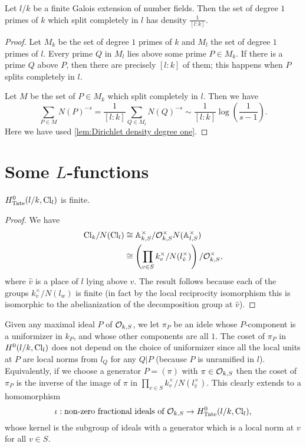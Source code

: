 \begin{lemma} \label{lem:Dirichlet density split}
	Let $l/k$ be a finite Galois extension of number fields.
	Then the set of degree $1$ primes of $k$ which split completely in $l$
	has density $\frac{1}{[l:k]}$.
\end{lemma}

\begin{proof}
	Let $M_k$ be the set of degree $1$ primes of $k$ and $M_l$ the set of degree $1$ primes of $l$.
	Every prime $Q$ in $M_l$ lies above some prime $P \in M_k$.
	If there is a prime $Q$ above $P$, then there are precisely $[l:k]$ of them; this happens when $P$
	splits completely in $l$.

	Let $M$ be the set of $P \in M_k$ which split completely in $l$.
	Then we have
	\[
		\sum_{P \in M} N(P)^{-s}
		=
		\frac{1}{[l:k]} \sum_{Q \in M_l} N(Q)^{-s}
		\sim \frac{1}{[l:k]} \log\left( \frac{1}{s-1}\right).
	\]
	Here we have used \ref{lem:Dirichlet density degree one}.
\end{proof}





\section{Some $L$-functions}

\begin{lemma} \label{lem:H0 idele class group finite}
	$H^0_{\mathrm{Tate}}(l/k,\mathrm{Cl}_l)$ is finite.
\end{lemma}

\begin{proof}
	We have
	\begin{align*}
		\mathrm{Cl}_{k} / N(\mathrm{Cl}_l)
		& \cong {\mathbb A}_{k,S}^\times / {\mathcal O}_{k,S}^\times N({\mathbb A}_{l,S}^\times) \\
		& \cong \left(\prod_{v \in S} k_v^\times / N(l_{\hat v}^\times)\right) / {\mathcal O}_{k,S}^\times,
	\end{align*}
	where $\hat v$ is a place of $l$ lying above $v$.
	The result follows because each of the groups $k_v^\times / N(l_w)$ is finite
	(in fact by the local reciprocity isomorphism this is isomorphic to the abelianization of the
	decomposition group at $\hat v$).
\end{proof}

Given any maximal ideal $P$ of ${\mathcal O}_{k,S}$, we let $\pi_P$ be an idele whose
$P$-component is a uniformizer in $k_P$, and whose other components are all $1$.
The coset of $\pi_P$ in $H^0(l/k,\mathrm{Cl}_l)$ does not depend on the choice of uniformizer since
all the local units at $P$ are local norms from $l_{Q}$ for any $Q|P$
(because $P$ is unramified in $l$).
Equivalently, if we choose a generator $P=(\pi)$ with $\pi \in {\mathcal O}_{k,S}$
then the coset of $\pi_P$ is the inverse of
the image of $\pi$ in $\prod_{v \in S} k_v^\times / N(l_{\hat v}^\times)$.
This clearly extends to a homomorphism
\[
	\iota : \textrm{non-zero fractional ideals of ${\mathcal O}_{k,S}$}
	\to
	H^0_{\mathrm{Tate}}(l/k,\mathrm{Cl}_l),
\]
whose kernel is the subgroup of ideals with a generator which is a local norm at $v$ for
all $v \in S$.


